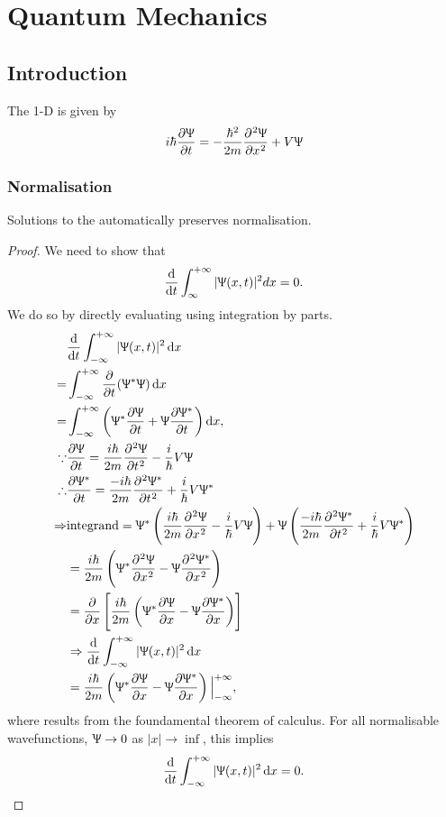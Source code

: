 \chapter{Quantum Mechanics}
\section{Introduction}
The 1-D \sch is given by
\begin{equation}
i\hbar\diffp{\ups}{t}=-\frac{\hbar^2}{2m}\diffp[2]{\ups}{x}+V\ups
\end{equation}
\subsection{Normalisation}
\begin{thrm}
\label{preservation}
Solutions to the \sch automatically preserves normalisation.
\end{thrm}
\begin{proof}
We need to show that
\begin{equation}
\diff*{\int^{+\inf}_{\inf}|\ups(x,t)|^2dx}t=0. 
\end{equation}
We do so by directly evaluating using integration by parts. 
\begin{subequations}
\begin{align}
&\diff*{\int^{+\inf}_{-\inf}|\ups(x,t)|^2\dx}t \\
=&\int^{+\inf}_{-\inf}\diffp*{(\ups^*\ups)}t \dx \\
=&\int^{+\inf}_{-\inf}\left(\ups^*\diffp{\ups}{t}+\ups\diffp{\ups^*}{t}\right)\dx, \\
\bec&\diffp{\ups}{t}=\frac{i\hbar}{2m}\diffp[2]{\ups}{t}-\frac{i}{\hbar}V\ups \\
\tf&\diffp{\ups^*}{t}=\frac{-i\hbar}{2m}\diffp[2]{\ups^*}{t}+\frac{i}{\hbar}V\ups^* \\
\imp&\text{integrand}=\ups^*\left(\frac{i\hbar}{2m}\diffp[2]{\ups}{x}-\frac{i}{\hbar}V\ups\right)+\ups\left(\frac{-i\hbar}{2m}\diffp[2]{\ups^*}{t}+\frac{i}{\hbar}V\ups^*\right) \\
&=\frac{i\hbar}{2m}\left(\ups^*\diffp[2]{\ups}{x}-\ups\diffp[2]{\ups^*}{x}\right) \\
&=\diffp*{\left[\frac{i\hbar}{2m}\left(\ups^*\diffp{\ups}{x}-\ups\diffp{\ups^*}{x}\right)\right]}x \label{norm8}\\
&\imp\diff*{\int^{+\inf}_{-\inf}|\ups(x,t)|^2\dx}t \\
&=\frac{i\hbar}{2m}\left(\ups^*\diffp{\ups}{x}-\ups\diffp{\ups^*}{x}\right)\Big|^{+\inf}_{-\inf} \label{norm10}, 
\end{align}
\end{subequations}
where  results from the foundamental theorem of calculus. 
For all normalisable wavefunctions, $\Uppsi\rightarrow0$ as $|x|\rightarrow\inf$, this implies 
\begin{equation}
\diff*{\int^{+\inf}_{-\inf}|\ups(x,t)|^2\dx}t=0. 
\end{equation}
\end{proof}

